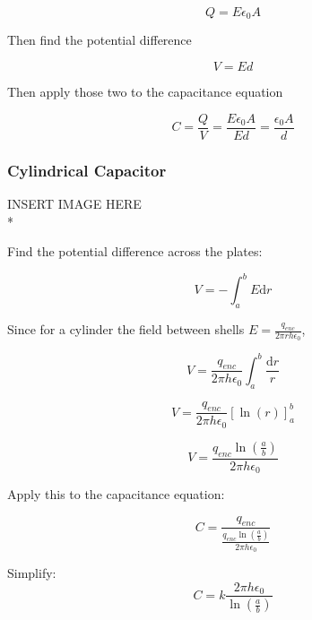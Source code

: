 \documentclass[a4paper,12pt]{article}
\begin{document}
				\begin{equation*}
						Q = E\epsilon_{0}A
				\end{equation*}

				Then find the potential difference
				
				\begin{equation*}
						V = Ed
				\end{equation*}

				Then apply those two to the capacitance equation

				\begin{equation*}
						C = \frac{Q}{V} = \frac{E\epsilon_{0}A}{Ed} = \frac{\epsilon_{0}A}{d}
				\end{equation*}
			\subsubsection{Cylindrical Capacitor}
				INSERT IMAGE HERE\\*

				Find the potential difference across the plates:

				\begin{equation*}
						V = - \int_{a}^{b} E\mathrm{d}r
				\end{equation*}

				Since for a cylinder the field between shells $E = \frac{q_{enc}}{2\pi rh \epsilon_{0}}$,

				\begin{equation*}
						V = \frac{q_{enc}}{2\pi h \epsilon_{0}}\int_{a}^{b} \frac{\mathrm{d}r}{r} 
				\end{equation*}


				\begin{equation*}
						V = \frac{q_{enc}}{2\pi h \epsilon_{0}}  \left[ \ln(r) \right]_{a}^{b}
				\end{equation*}

				\begin{equation*}
						V = \frac{q_{enc} \ln(\frac{a}{b})}{2\pi h\epsilon_{0}}
				\end{equation*}

				Apply this to the capacitance equation:

				\begin{equation*}
						C = \frac{q_{enc}}{\frac{q_{enc} \ln(\frac{a}{b})}{2\pi h\epsilon_{0}} }
				\end{equation*}

				Simplify:
				\begin{equation*}
						C = k \frac{2\pi h \epsilon_{0}}{\ln(\frac{a}{b})}
				\end{equation*}
\end{document}
